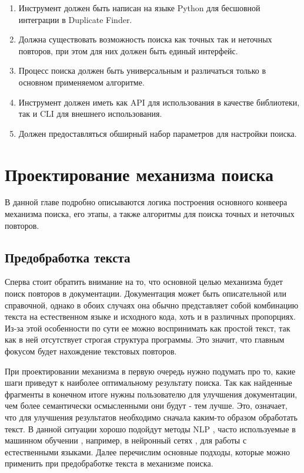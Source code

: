 \documentclass[14pt]{matmex-diploma-custom}
\begin{document}
\begin{enumerate}
	\item Инструмент должен быть написан на языке Python для бесшовной интеграции в Duplicate Finder.
	\item Должна существовать возможность поиска как точных так и неточных повторов, при этом для них должен быть единый интерфейс.
	\item Процесс поиска должен быть универсальным и различаться только в основном применяемом алгоритме.
	\item Инструмент должен иметь как API для использования в качестве библиотеки, так и CLI для внешнего использования.
	\item Должен предоставляться обширный набор параметров для настройки поиска.
\end{enumerate}

\section{Проектирование механизма поиска}

В данной главе подробно описываются логика построения основного конвеера механизма поиска, его этапы, а также алгоритмы для поиска точных и неточных повторов.

\subsection{Предобработка текста}

Сперва стоит обратить внимание на то, что основной целью механизма будет поиск повторов в документации. Документация может быть описательной или справочной, однако в обоих случаях она обычно представляет собой комбинацию текста на естественном языке и исходного кода, хоть и в различных пропорциях. Из-за этой особенности по сути ее можно воспринимать как простой текст, так как в ней отсутствует строгая структура программы. Это значит, что главным фокусом будет нахождение текстовых повторов.

При проектировании механизма в первую очередь нужно подумать про то, какие шаги приведут к наиболее оптимальному результату поиска. Так как найденные фрагменты в конечном итоге нужны пользователю для улучшения документации, чем более семантически осмысленными они будут - тем лучше. Это, означает, что для улучшения результатов необходимо сначала каким-то образом обработать текст. В данной ситуации хорошо подойдут методы NLP \cite{bib:art:NLP}, часто используемые в машинном обучении \cite{bib:art:Preprocessing}, например, в нейронный сетях \cite{bib:art:NeuralNetworks, bib:tool:NeuroDupDetect}, для работы с естественными языками. Далее перечислим основные подходы, которые можно применить при предобработке текста в механизме поиска.
\end{document}
